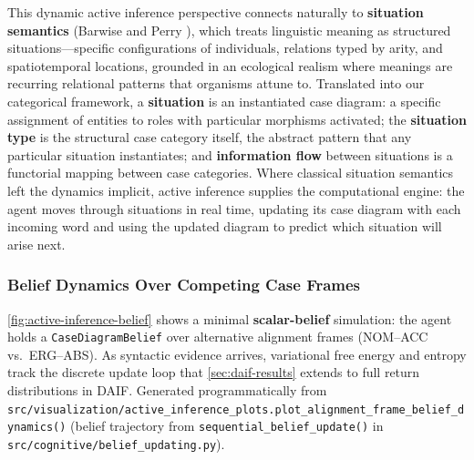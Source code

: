 \documentclass[
]{article}
\begin{document}
This dynamic active inference perspective connects naturally to
\textbf{situation semantics} (Barwise and Perry
\citeyearpar{barwise1983situations}), which treats linguistic meaning as
structured situations---specific configurations of individuals,
relations typed by arity, and spatiotemporal locations, grounded in an
ecological realism where meanings are recurring relational patterns that
organisms attune to. Translated into our categorical framework, a
\textbf{situation} is an instantiated case diagram: a specific
assignment of entities to roles with particular morphisms activated; the
\textbf{situation type} is the structural case category itself, the
abstract pattern that any particular situation instantiates; and
\textbf{information flow} between situations is a functorial mapping
between case categories. Where classical situation semantics left the
dynamics implicit, active inference supplies the computational engine:
the agent moves through situations in real time, updating its case
diagram with each incoming word and using the updated diagram to predict
which situation will arise next.

\subsubsection{Belief Dynamics Over Competing Case
Frames}\label{belief-dynamics-over-competing-case-frames}

\autoref{fig:active-inference-belief} shows a minimal
\textbf{scalar-belief} simulation: the agent holds a
\texttt{CaseDiagramBelief} over alternative alignment frames (NOM--ACC
vs.~ERG--ABS). As syntactic evidence arrives, variational free energy
and entropy track the discrete update loop that
\autoref{sec:daif-results} extends to full return distributions in DAIF.
Generated programmatically from
\texttt{src/visualization/active\_inference\_plots.plot\_alignment\_frame\_belief\_dynamics()}
(belief trajectory from \texttt{sequential\_belief\_update()} in
\texttt{src/cognitive/belief\_updating.py}).
\end{document}
